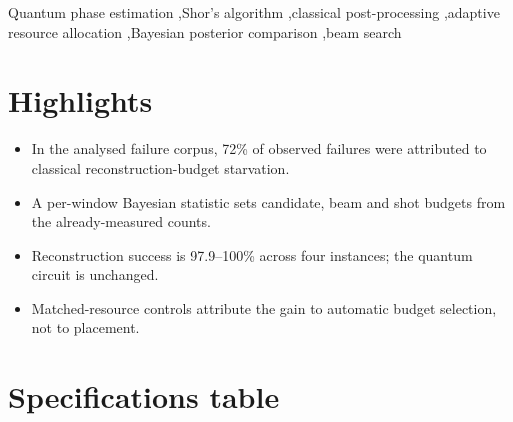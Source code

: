 \documentclass[preprint,11pt]{elsarticle}
\newcommand{\Cw}{C_w}
\begin{document}
\begin{frontmatter}
\begin{abstract}
Validation is noiseless, simulation-only, and confined to
$N\in\{15,21\}$ at orders $r\in\{2,4,6\}$, a ceiling imposed by a
measured compilation cliff rather than chosen; and $\Cw$, while an
effective ranking signal, is measurably overconfident (Brier 0.2239) and
must not be read as a calibrated probability.
\end{abstract}

\begin{keyword}
Quantum phase estimation \sep Shor's algorithm \sep classical
post-processing \sep adaptive resource allocation \sep Bayesian posterior
comparison \sep beam search
\end{keyword}

\end{frontmatter}

\section*{Highlights}
\begin{itemize}\itemsep2pt
\item In the analysed failure corpus, 72\% of observed failures were
      attributed to classical reconstruction-budget starvation.
\item A per-window Bayesian statistic sets candidate, beam and shot
      budgets from the already-measured counts.
\item Reconstruction success is 97.9--100\% across four instances; the
      quantum circuit is unchanged.
\item Matched-resource controls attribute the gain to automatic budget
      selection, not to placement.
\end{itemize}

\section*{Specifications table}
\end{document}
